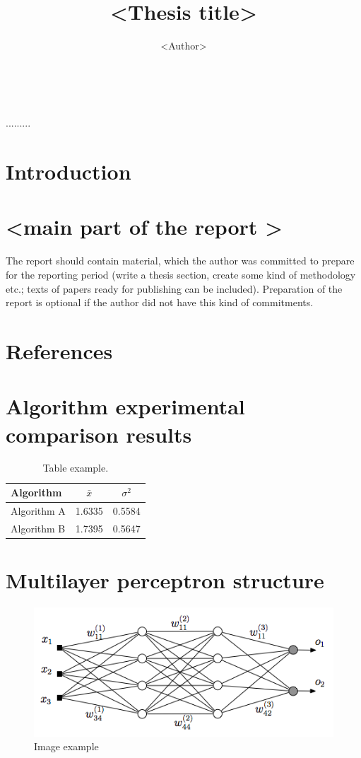 \documentclass[11pt, a4paper]{article}
\date{\monthname\ \the\year}
\title{<Thesis title>}
\author{<Author>}
\begin{document}
\maketitle

.........


\tableofcontents

\section{Introduction}

\section{<main part of the report >}
The report should contain material, which the author was committed to prepare
for the reporting period (write a thesis section, create some kind of
methodology etc.; texts of papers ready for publishing can be included).
Preparation of the report is optional if the author did not have this kind of
commitments.

\section{References}%
%    

\appendix
\section{Algorithm experimental comparison results}
\begin{table}[H]
  \centering
  \caption{Table example.}
  {\begin{tabular}{|l|c|c|} \hline
    Algorithm    & $\bar{x}$ & $\sigma^{2}$ \\
    \hline
    Algorithm A  & 1.6335    & 0.5584       \\
    Algorithm B  & 1.7395    & 0.5647       \\
    \hline
  \end{tabular}}
  \label{tab:table example}
\end{table}

\section{Multilayer perceptron structure}
\begin{figure}[H]
    \centering
\includegraphics[scale=0.5]{img/MLP}
\caption{Image example}
\end{figure}
\end{document}
